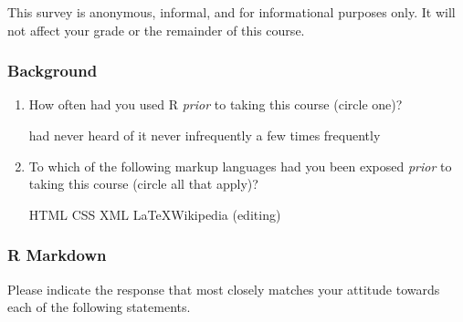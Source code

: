 \documentclass[10pt]{article}
\begin{document}

This survey is anonymous, informal, and for informational purposes only. It will not affect your grade or the remainder of this course.

\subsubsection*{Background}
\begin{enumerate}
	\item How often had you used R \emph{prior} to taking this course (circle one)?
	\begin{center}
		had never heard of it \qquad never \qquad infrequently \qquad a few times \qquad frequently
	\end{center}
	\item To which of the following markup languages had you been exposed \emph{prior} to taking this course (circle all that apply)?
	\begin{center}
		HTML \qquad CSS \qquad XML \qquad \LaTeX \qquad Wikipedia (editing)
	\end{center}
\end{enumerate}

\subsubsection*{R Markdown}

Please indicate the response that most closely matches your attitude towards each of the following statements.
\end{document}
